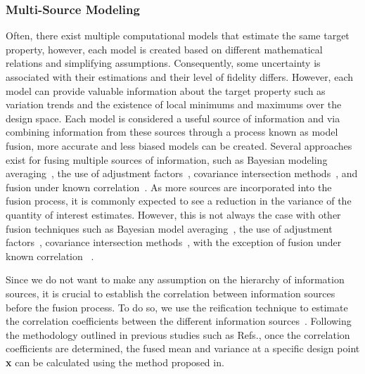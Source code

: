 \subsubsection{Multi-Source Modeling}


Often, there exist multiple computational models that estimate the same target property, however, each model is created based on different mathematical relations and simplifying assumptions. Consequently, some uncertainty is associated with their estimations and their level of fidelity differs. However, each model can provide valuable information about the target property such as variation trends and the existence of local minimums and maximums over the design space. Each model is considered a useful source of information and via combining information from these sources through a process known as model fusion, more accurate and less biased models can be created. Several approaches exist for fusing multiple sources of information, such as Bayesian modeling averaging~\cite{Clyde2003,Clyde2004,Draper1995,Hoeting1999,Leamer_1978,Madigan1994}, the use of adjustment factors~\cite{Mosleh1986,Reinert_2006,Riley2011,Zio_1996}, covariance intersection methods~\cite{Julier1997}, and fusion under known correlation~\cite{Geisser1965,Morris1977,Winkler_1981}. 
As more sources are incorporated into the fusion process, it is commonly expected to see a reduction in the variance of the quantity of interest estimates. However, this is not always the case with other fusion techniques such as Bayesian model averaging~\cite{Clyde2003,Clyde2004,Draper1995,Hoeting1999,Leamer_1978,Madigan1994,talapatra2018autonomous}, the use of adjustment factors~\cite{Mosleh1986,Reinert_2006,Riley2011,Zio_1996}, covariance intersection methods~\cite{Julier1997},
with the exception of fusion under known correlation ~\cite{Geisser1965,Morris1977,Winkler_1981}. 

Since we do not want to make any assumption on the hierarchy of information sources, it is crucial to establish the correlation between information sources before the fusion process. To do so, we use the reification technique to estimate the correlation coefficients between the different information sources~\cite{allaire2012fusing,thomison2017model}. Following the methodology outlined in previous studies such as Refs.\cite{allaire2012fusing,ghoreishi2018multi,ghoreishi2019JAIS,thomison2017model}, once the correlation coefficients are determined, the fused mean and variance at a specific design point \textbf{x} can be calculated using the method proposed in\cite{Winkler_1981}.

